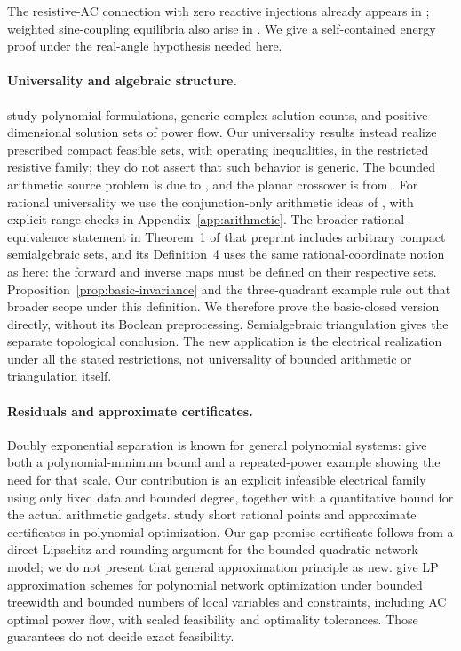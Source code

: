 The resistive-AC connection with zero reactive injections already appears
in \citet[Appendix B, Case 2]{LavaeiLow2012}; weighted sine-coupling
equilibria also arise in \citet{DorflerEtAl2013}. We give a self-contained
energy proof under the real-angle hypothesis needed here.

\paragraph{Universality and algebraic structure.}
\citet{MarecekEtAl2016} study polynomial formulations, generic complex
solution counts, and positive-dimensional solution sets of power flow. Our
universality results instead realize prescribed compact feasible sets, with
operating inequalities, in the restricted resistive family; they do not
assert that such behavior is generic. The bounded arithmetic source problem
is due to \citet{AbrahamsenEtAl2018,AbrahamsenEtAl2022}, and the planar
crossover is from \citet{DobbinsEtAl2023}. For rational universality we use
the conjunction-only arithmetic ideas of \citet{AbrahamsenMiltzow2019}, with
explicit range checks in Appendix~\ref{app:arithmetic}. The broader
rational-equivalence statement in Theorem~1 of that preprint includes
arbitrary compact semialgebraic sets, and its Definition~4 uses the same
rational-coordinate notion as here: the forward and inverse maps must be
defined on their respective sets.
Proposition~\ref{prop:basic-invariance} and the three-quadrant example rule
out that broader scope under this definition. We therefore prove the
basic-closed version directly, without its Boolean preprocessing.
Semialgebraic triangulation \citep{OhmotoShiota2017} gives the separate
topological conclusion. The new application is the electrical realization
under all the stated restrictions, not universality of bounded arithmetic
or triangulation itself.

\paragraph{Residuals and approximate certificates.}
Doubly exponential separation is known for general polynomial systems:
\citet{JeronimoEtAl2013} give both a polynomial-minimum bound and a
repeated-power example showing the need for that scale. Our contribution is
an explicit infeasible electrical family using only fixed data and bounded
degree, together with a quantitative bound for the actual arithmetic
gadgets. \citet{BienstockDelPiaHildebrand2023} study short rational points
and approximate certificates in polynomial optimization. Our gap-promise
certificate follows from a direct Lipschitz and rounding argument for the
bounded quadratic network model; we do not present that general
approximation principle as new.
\citet[Theorem 7 and Corollary 8 of the arXiv version]{BienstockMunoz2018}
give LP approximation schemes for polynomial network optimization under
bounded treewidth and bounded numbers of local variables and constraints,
including AC optimal power flow, with scaled feasibility and optimality
tolerances. Those guarantees do not decide exact feasibility.

